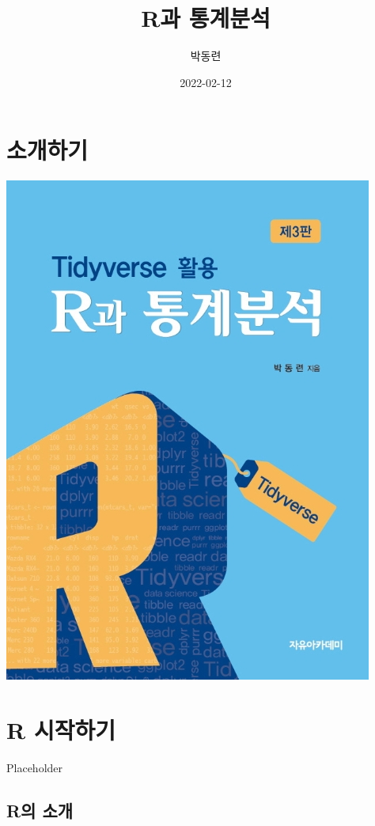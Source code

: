 \documentclass[
]{book}
\title{R과 통계분석}
\author{박동련}
\date{2022-02-12}
\begin{document}
\maketitle

{
\setcounter{tocdepth}{1}
\tableofcontents
}
\hypertarget{uxc18cuxac1cuxd558uxae30}{%
\chapter*{소개하기}\label{uxc18cuxac1cuxd558uxae30}}

\includegraphics{Figure/cover.jpg}

\hypertarget{r-uxc2dcuxc791uxd558uxae30}{%
\chapter{R 시작하기}\label{r-uxc2dcuxc791uxd558uxae30}}

Placeholder

\hypertarget{ruxc758-uxc18cuxac1c}{%
\section{R의 소개}\label{ruxc758-uxc18cuxac1c}}
\end{document}

